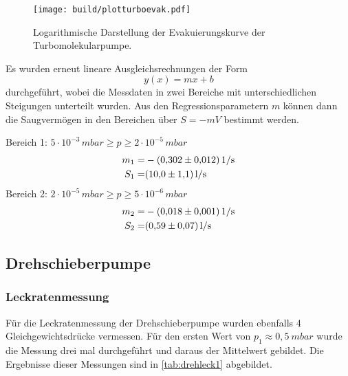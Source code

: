 \begin{figure}[H]
  \centering
  \texttt{[image: build/plotturboevak.pdf]}
  \caption{Logarithmische Darstellung der Evakuierungskurve der Turbomolekularpumpe.}
  \label{fig:plotturboevak}
\end{figure}
\noindent
Es wurden erneut lineare Ausgleichsrechnungen der Form
\begin{equation}
	y(x)=mx+b
\end{equation}
durchgeführt, wobei die Messdaten in zwei Bereiche mit unterschiedlichen Steigungen unterteilt wurden. 
Aus den Regressionsparametern $m$ können dann die Saugvermögen in den Bereichen über $S=-mV$ bestimmt werden.

\noindent
Bereich 1: $5 \cdot 10^{-3} \, \si{mbar} \geq p \geq 2 \cdot 10^{-5} \, \si{mbar}$\\
\begin{align*}
	m_1=& -\SI{0,302 \pm 0,012}{1/s}\\
	S_1=& \SI{10,0 \pm 1,1}{l/s}
\end{align*}
Bereich 2: $2 \cdot 10^{-5} \, \si{mbar} \geq p \geq 5 \cdot 10^{-6} \, \si{mbar}$\\
\begin{align*}
	m_2=& -\SI{0,018 \pm 0,001}{1/s}\\
	S_2=& \SI{0,59 \pm 0,07}{l/s}
\end{align*}


\subsection{Drehschieberpumpe}
\label{subsec:Drehschieberpumpee}


\subsubsection{Leckratenmessung}


Für die Leckratenmessung der Drehschieberpumpe wurden ebenfalls 4 Gleichgewichtsdrücke vermessen.
Für den ersten Wert von $p_1 \approx 0,5 \: \si{mbar}$ wurde die Messung drei mal durchgeführt und daraus der Mittelwert gebildet.
Die Ergebnisse dieser Messungen sind in \autoref{tab:drehleck1} abgebildet.



